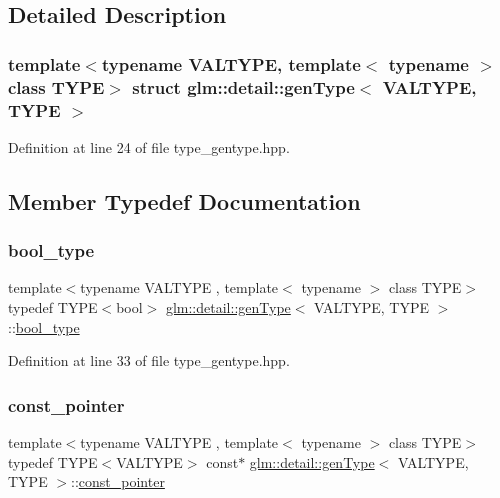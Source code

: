 \subsection{Detailed Description}
\subsubsection*{template$<$typename V\+A\+L\+T\+Y\+PE, template$<$ typename $>$ class T\+Y\+PE$>$\newline
struct glm\+::detail\+::gen\+Type$<$ V\+A\+L\+T\+Y\+P\+E, T\+Y\+P\+E $>$}



Definition at line 24 of file type\+\_\+gentype.\+hpp.



\subsection{Member Typedef Documentation}
\mbox{\label{structglm_1_1detail_1_1gen_type_ac338f0b4e47d5daa9c8e5411f0d37554}} 
\subsubsection{\texorpdfstring{bool\_type}{bool\_type}}
{\footnotesize\ttfamily template$<$typename V\+A\+L\+T\+Y\+PE , template$<$ typename $>$ class T\+Y\+PE$>$ \\
typedef T\+Y\+PE$<$bool$>$ \mbox{\hyperlink{structglm_1_1detail_1_1gen_type}{glm\+::detail\+::gen\+Type}}$<$ V\+A\+L\+T\+Y\+PE, T\+Y\+PE $>$\+::\mbox{\hyperlink{structglm_1_1detail_1_1gen_type_ac338f0b4e47d5daa9c8e5411f0d37554}{bool\+\_\+type}}}



Definition at line 33 of file type\+\_\+gentype.\+hpp.

\mbox{\label{structglm_1_1detail_1_1gen_type_ade82fbfd7b15096223e1b133c148b5e2}} 
\subsubsection{\texorpdfstring{const\_pointer}{const\_pointer}}
{\footnotesize\ttfamily template$<$typename V\+A\+L\+T\+Y\+PE , template$<$ typename $>$ class T\+Y\+PE$>$ \\
typedef T\+Y\+PE$<$V\+A\+L\+T\+Y\+PE$>$ const$\ast$ \mbox{\hyperlink{structglm_1_1detail_1_1gen_type}{glm\+::detail\+::gen\+Type}}$<$ V\+A\+L\+T\+Y\+PE, T\+Y\+PE $>$\+::\mbox{\hyperlink{structglm_1_1detail_1_1gen_type_ade82fbfd7b15096223e1b133c148b5e2}{const\+\_\+pointer}}}



